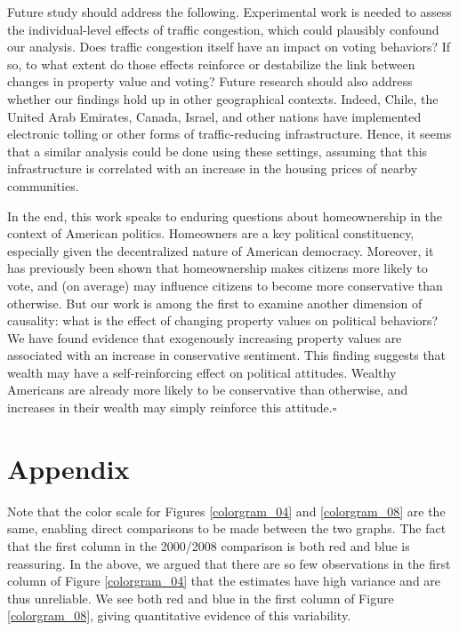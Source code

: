 \documentclass[11.0pt]{article}
\theoremstyle{definition}
\begin{document}
Future study should address the following. Experimental work is needed to assess the individual-level effects of traffic congestion, which could plausibly confound our analysis. Does traffic congestion itself have an impact on voting behaviors? If so, to what extent do those effects reinforce or destabilize the link between changes in property value and voting? Future research should also address whether our findings hold up in other geographical contexts. Indeed, Chile, the United Arab Emirates, Canada, Israel, and other nations have implemented electronic tolling or other forms of traffic-reducing infrastructure. Hence, it seems that a similar analysis could be done using these settings, assuming that this infrastructure is correlated with an increase in the housing prices of nearby communities. 
 
In the end, this work speaks to enduring questions about homeownership in the context of American politics. Homeowners are a key political constituency, especially given the decentralized nature of American democracy. Moreover, it has previously been shown that homeownership makes citizens more likely to vote, and (on average) may influence citizens to become more conservative than otherwise. But our work is among the first to examine another dimension of causality: what is the effect of changing property values on political behaviors? We have found evidence that exogenously increasing property values are associated with an increase in conservative sentiment. This finding suggests that wealth may have a self-reinforcing effect on political attitudes. Wealthy Americans are already more likely to be conservative than otherwise, and increases in their wealth may simply reinforce this attitude.\hfill $\square$ 

\clearpage 
\section*{Appendix}
Note that the color scale for Figures \ref{colorgram_04} and \ref{colorgram_08} are the same, enabling direct comparisons to be made between the two graphs. The fact that the first column in the 2000/2008 comparison is both red and blue is reassuring. In the above, we argued that there are so few observations in the first column of Figure \ref{colorgram_04} that the estimates have high variance and are thus unreliable. We see both red and blue in the first column of Figure \ref{colorgram_08}, giving quantitative evidence of this variability. 
\end{document}

